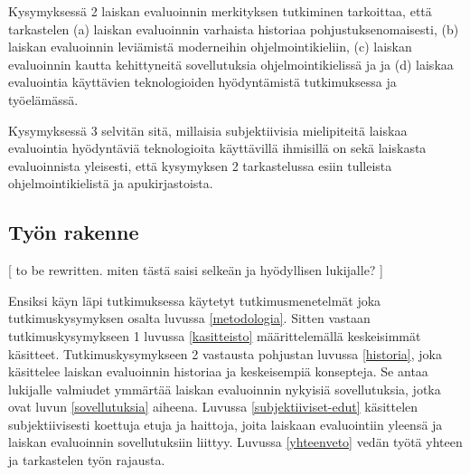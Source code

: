 Kysymyksessä 2 laiskan evaluoinnin merkityksen tutkiminen tarkoittaa, että tarkastelen (a) laiskan evaluoinnin varhaista historiaa pohjustuksenomaisesti, (b) laiskan evaluoinnin leviämistä moderneihin ohjelmointikieliin, (c) laiskan evaluoinnin kautta kehittyneitä sovellutuksia ohjelmointikielissä ja ja (d) laiskaa evaluointia käyttävien teknologioiden hyödyntämistä tutkimuksessa ja työelämässä.

Kysymyksessä 3 selvitän sitä, millaisia subjektiivisia mielipiteitä laiskaa evaluointia hyödyntäviä teknologioita käyttävillä ihmisillä on sekä laiskasta evaluoinnista yleisesti, että kysymyksen 2 tarkastelussa esiin tulleista ohjelmointikielistä ja apukirjastoista.

\subsection{Työn rakenne}

[ to be rewritten. miten tästä saisi selkeän ja hyödyllisen lukijalle? ]

Ensiksi käyn läpi tutkimuksessa käytetyt tutkimusmenetelmät joka tutkimuskysymyksen osalta luvussa \ref{metodologia}. Sitten vastaan tutkimuskysymykseen 1 luvussa \ref{kasitteisto} määrittelemällä keskeisimmät käsitteet. Tutkimuskysymykseen 2 vastausta pohjustan luvussa \ref{historia}, joka käsittelee laiskan evaluoinnin historiaa ja keskeisempiä konsepteja. Se antaa lukijalle valmiudet ymmärtää laiskan evaluoinnin nykyisiä sovellutuksia, jotka ovat luvun \ref{sovellutuksia} aiheena. Luvussa \ref{subjektiiviset-edut} käsittelen subjektiivisesti koettuja etuja ja haittoja, joita laiskaan evaluointiin yleensä ja laiskan evaluoinnin sovellutuksiin liittyy. Luvussa \ref{yhteenveto} vedän työtä yhteen ja tarkastelen työn rajausta.
